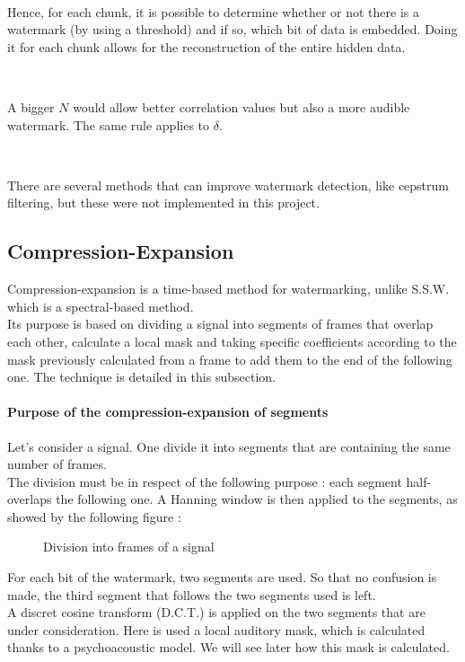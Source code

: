 ~

Hence, for each chunk, it is possible to determine whether or not there is a watermark (by using a threshold) and if so, which bit of data is embedded. Doing it for each chunk allows for the reconstruction of the entire hidden data.

~

A bigger $N$ would allow better correlation values but also a more audible watermark. The same rule applies to $\delta$.

~

There are several methods that can improve watermark detection, like cepstrum filtering, but these were not implemented in this project.

\subsection{Compression-Expansion}\cite{foo2010}

Compression-expansion is a time-based method for watermarking, unlike S.S.W. which is a spectral-based method.\\
Its purpose is based on dividing a signal into segments of frames that overlap each other, calculate a local mask and taking specific coefficients according to the mask previously calculated from a frame to add them to the end of the following one. The technique is detailed in this subsection.

\paragraph{Purpose of the compression-expansion of segments}
Let's consider a signal. One divide it into segments that are containing the same number of frames.\\
The division must be in respect of the following purpose : each segment half-overlaps the following one. A Hanning window is then applied to the segments, as showed by the following figure :
\begin{figure}[H]
\caption{\label{frames} Division into frames of a signal}
\end{figure}
For each bit of the watermark, two segments are used. So that no confusion is made, the third segment that follows the two segments used is left.\\
A discret cosine transform (D.C.T.) is applied on the two segments that are under consideration. Here is used a local auditory mask, which is calculated thanks to a psychoacoustic model. We will see later how this mask is calculated.

